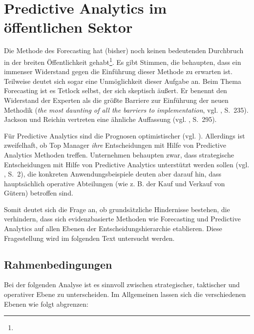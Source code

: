 \chapter{Predictive Analytics im öffentlichen Sektor}

Die Methode des Forecasting hat (bisher) noch keinen bedeutenden Durchbruch in
der breiten Öffentlichkeit gehabt\footnote{

}. Es gibt Stimmen, die behaupten, dass ein immenser Widerstand gegen die
Einführung dieser Methode zu erwarten ist. Teilweise deutet sich sogar eine
Unmöglichkeit dieser Aufgabe an. 
Beim Thema Forecasting ist es Tetlock selbst, der sich skeptisch äußert. Er
benennt den Widerstand der Experten als die größte Barriere zur Einführung der
neuen Methodik (\emph{the most daunting of all the barriers to implementation},
vgl. \cite{Tetlock}, S.~235). Jackson und Reichin vertreten eine ähnliche
Auffassung (vgl. \cite{Jackson}, S.~295). 

Für Predictive Analytics sind die Prognosen optimistischer (vgl. \cite{Mauerer}).
Allerdings ist zweifelhaft, ob Top Manager \emph{ihre} Entscheidungen mit Hilfe
von Predictive Analytics Methoden treffen.
Unternehmen behaupten zwar, dass strategische Entscheidungen mit Hilfe von Predictive Analytics
unterstützt werden sollen (vgl. \cite{Mauerer}, S.~2), die konkreten Anwendungsbeispiele deuten
aber darauf hin, dass hauptsächlich operative Abteilungen (wie z. B. der Kauf und Verkauf von
Gütern) betroffen sind.

Somit deutet sich die Frage an, ob grundsätzliche Hindernisse bestehen, die verhindern, dass sich
evidenzbasierte Methoden wie Forecasting und Predictive Analytics auf allen Ebenen der
Entscheidungshierarchie etablieren. Diese Fragestellung wird im folgenden Text untersucht werden.

\section{Rahmenbedingungen}

Bei der folgenden Analyse ist es sinnvoll zwischen strategischer, taktischer und
operativer Ebene zu unterscheiden. Im Allgemeinen lassen sich die verschiedenen
Ebenen wie folgt abgrenzen:

